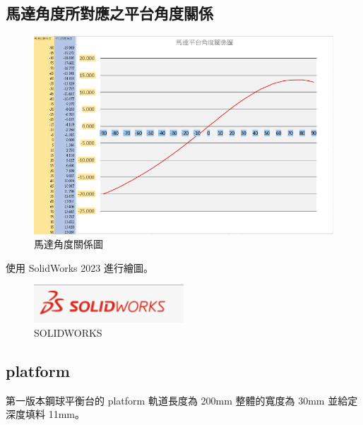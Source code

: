 \subsection*{馬達角度所對應之平台角度關係}

\begin{figure}[htbp]
    \centering
    \includegraphics[width=1\textwidth]{./../images/6-1-50}
    \caption{馬達角度關係圖}
\end{figure}

\newpage

使用 SolidWorks 2023 進行繪圖。
\begin{figure}[htbp]
    \centering
    \includegraphics[width=0.5\textwidth]{./../images/6-1-1}
    \caption{SOLIDWORKS}
\end{figure}

\subsection*{platform}

第一版本鋼球平衡台的 platform 軌道長度為 200mm 整體的寬度為 30mm 並給定深度填料 11mm。

